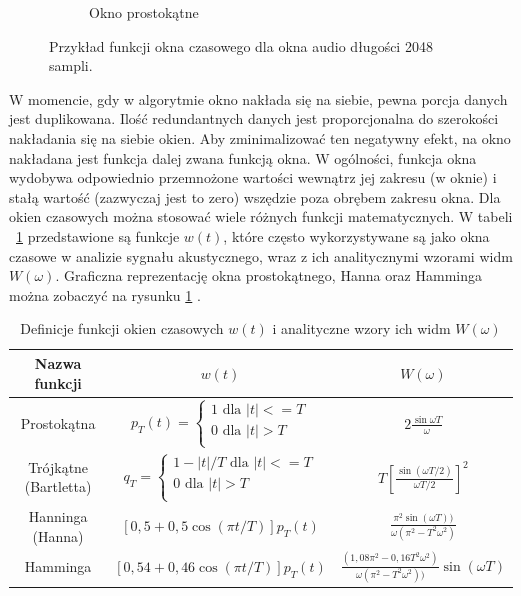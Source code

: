 \documentclass[12pt,a4paper,twoside]{mwart}
\begin{document}
\begin{figure}[t]
\begin{subfigure}{0.49\textwidth}
    \caption{Okno prostokątne}
  \end{subfigure}
  \caption{Przykład funkcji okna czasowego dla okna audio długości 2048 sampli.}
  \label{fig:WindowFunctions}
\end{figure}


W momencie, gdy w algorytmie okno nakłada się na siebie, pewna porcja danych jest duplikowana. Ilość redundantnych danych jest proporcjonalna do szerokości nakładania się na siebie okien. Aby zminimalizować ten negatywny efekt, na okno nakładana jest funkcja dalej zwana funkcją okna. W ogólności, funkcja okna wydobywa odpowiednio przemnożone wartości wewnątrz jej zakresu (w oknie) i stałą wartość (zazwyczaj jest to zero) wszędzie poza obrębem zakresu okna. Dla okien czasowych można stosować wiele różnych funkcji matematycznych. W tabeli ~\ref{tab:definicjeOkien} przedstawione są funkcje $w(t)$, które często wykorzystywane są jako okna czasowe w analizie sygnału akustycznego, wraz z ich analitycznymi wzorami widm $W(\omega)$. Graficzna reprezentację okna prostokątnego, Hanna oraz Hamminga można zobaczyć na rysunku \ref{fig:WindowFunctions}
\cite[87-90]{CyfrowePrzetwarzanieSygnalowOdTeoriiDoZastosowan}
\cite{Transcription:Kunieda:Aclos}.

\begin{table}[t]
  \begin{center}
    \begin{tabular}{ |c|c|c| } 
    \hline
    Nazwa funkcji & $w(t)$ & $W(\omega)$\\
    \hline
    Prostokątna & $p_T (t) = \left\{
      \begin{array}{ll}
        1 \text{ dla } |t| <= T\\
        0 \text{ dla } |t| > T\\
      \end{array}
    \right.  $ & $2\frac{\sin \omega T}{\omega}$\\
    \hline
    Trójkątne (Bartletta) & $q_T = \left\{
      \begin{array}{ll}
        1-|t|/T \text{ dla } |t| <= T\\
        0 \text{ dla } |t| > T\\
      \end{array}
    \right. $ & $T[\frac{\sin(\omega T / 2)}{\omega T/2}]^2$\\
    \hline
    Hanninga (Hanna) & $[0,5 + 0,5 \cos(\pi t / T)]p_T (t)$ & 
    $\frac{\pi^2 \sin(\omega T))}{\omega(\pi^2 - T^2 \omega^2)}$\\
    \hline
    Hamminga & $[0,54 + 0,46\cos(\pi t/T)]p_T (t)$ & 
    $\frac{(1,08\pi^2 - 0,16T^2\omega^2)}{\omega(\pi^2 - T^2 \omega^2))}\sin(\omega T)$\\
    \hline
    \end{tabular}
  \end{center}
  \caption{Definicje funkcji okien czasowych $w(t)$ i analityczne wzory ich widm $W(\omega)$}
  \label{tab:definicjeOkien}
\end{table}
\end{document}
